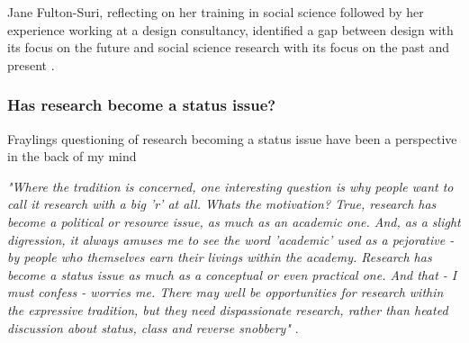 Jane Fulton-Suri, reflecting on her training in social science followed by her experience working at a design consultancy, identified a gap between design with its focus on the future and social science research with its focus on the past and present \autocite[p. 167]{zimmerman_research_2014}.

\subsubsection{Has research become a status issue?}

Fraylings questioning of research becoming a status issue have been a perspective in the back of my mind 

\emph{"Where the tradition is concerned, one interesting question is why people want to call it research with a big 'r' at all. Whats the motivation? True, research has become a political or resource issue, as much as an academic one. And, as a slight digression, it always amuses me to see the word 'academic' used as a pejorative - by people who themselves earn their livings within the academy. Research has become a status issue as much as a conceptual or even practical one. And that - I must confess - worries me. There may well be opportunities for research within the expressive tradition, but they need dispassionate research, rather than heated discussion about status, class and reverse snobbery"} \autocite[p. 5]{frayling_1994}.

\par

\begin{comment}
\subsection{form, fit, context: learning about the context }

I believe, as a first step, it is important to try to be as fully immersed in the existing context of ‘what Klimahuset is’, as possible. Before thinking about what form the installation should have, I need a thorough understanding of the context the installation is to be placed in, to be able to start shaping the form. The existing context will also set some constraints for what kind of fit the installation will have in the context, a fit that will be continually evaluated throughout the design process. 


In the documents I have gotten access to from Klimahuset, there is a great focus on the buildings architecture. Design and architecture goes hand in hand, and the architectural outline of the exhibition space, sets creative constraints and limits for what the installation can be. It is also the “opportunity space” (mulighetsrom) I have available in the design of the installation. It is therefore important for me to know the “material”, thoughts and reasoning behind it.
\end{comment}
